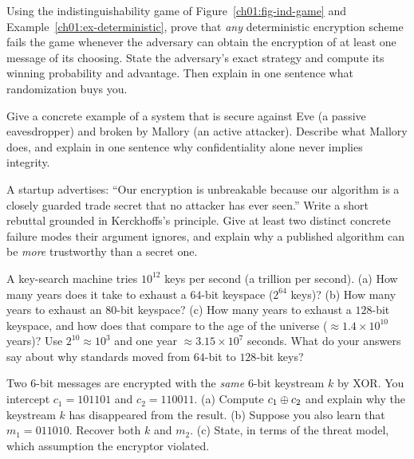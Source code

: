 \begin{exercise}
Using the indistinguishability game of Figure~\ref{ch01:fig-ind-game} and Example~\ref{ch01:ex-deterministic}, prove that \emph{any} deterministic encryption scheme fails the game whenever the adversary can obtain the encryption of at least one message of its choosing. State the adversary's exact strategy and compute its winning probability and advantage. Then explain in one sentence what randomization buys you.
\end{exercise}

\begin{exercise}
Give a concrete example of a system that is secure against Eve (a passive eavesdropper) and broken by Mallory (an active attacker). Describe what Mallory does, and explain in one sentence why confidentiality alone never implies integrity.
\end{exercise}

\begin{exercise}
A startup advertises: ``Our encryption is unbreakable because our algorithm is a closely guarded trade secret that no attacker has ever seen.'' Write a short rebuttal grounded in Kerckhoffs's principle. Give at least two distinct concrete failure modes their argument ignores, and explain why a published algorithm can be \emph{more} trustworthy than a secret one.
\end{exercise}

\begin{exercise}
A key-search machine tries $10^{12}$ keys per second (a trillion per second).
(a) How many years does it take to exhaust a $64$-bit keyspace ($2^{64}$ keys)?
(b) How many years to exhaust an $80$-bit keyspace?
(c) How many years to exhaust a $128$-bit keyspace, and how does that compare to the age of the universe ($\approx 1.4 \times 10^{10}$ years)?
Use $2^{10} \approx 10^{3}$ and one year $\approx 3.15 \times 10^{7}$ seconds. What do your answers say about why standards moved from $64$-bit to $128$-bit keys?
\end{exercise}

\begin{exercise}
Two $6$-bit messages are encrypted with the \emph{same} $6$-bit keystream $k$ by XOR. You intercept
$c_1 = 101101$ and $c_2 = 110011$.
(a) Compute $c_1 \oplus c_2$ and explain why the keystream $k$ has disappeared from the result.
(b) Suppose you also learn that $m_1 = 011010$. Recover both $k$ and $m_2$.
(c) State, in terms of the threat model, which assumption the encryptor violated.
\end{exercise}

